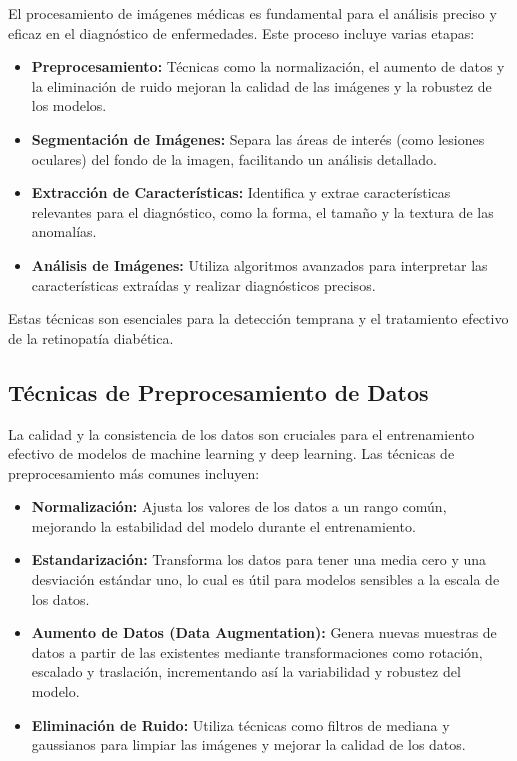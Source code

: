 El procesamiento de imágenes médicas es fundamental para el análisis preciso y eficaz en el diagnóstico de enfermedades. Este proceso incluye varias etapas:

\begin{itemize}
 \item \textbf{Preprocesamiento:} Técnicas como la normalización, el aumento de datos y la eliminación de ruido mejoran la calidad de las imágenes y la robustez de los modelos.
 \item \textbf{Segmentación de Imágenes:} Separa las áreas de interés (como lesiones oculares) del fondo de la imagen, facilitando un análisis detallado.
 \item \textbf{Extracción de Características:} Identifica y extrae características relevantes para el diagnóstico, como la forma, el tamaño y la textura de las anomalías.
 \item \textbf{Análisis de Imágenes:} Utiliza algoritmos avanzados para interpretar las características extraídas y realizar diagnósticos precisos.
\end{itemize}

Estas técnicas son esenciales para la detección temprana y el tratamiento efectivo de la retinopatía diabética.

\subsection{Técnicas de Preprocesamiento de Datos}

La calidad y la consistencia de los datos son cruciales para el entrenamiento efectivo de modelos de machine learning y deep learning. Las técnicas de preprocesamiento más comunes incluyen:

\begin{itemize}
 \item \textbf{Normalización:} Ajusta los valores de los datos a un rango común, mejorando la estabilidad del modelo durante el entrenamiento.
 \item \textbf{Estandarización:} Transforma los datos para tener una media cero y una desviación estándar uno, lo cual es útil para modelos sensibles a la escala de los datos.
 \item \textbf{Aumento de Datos (Data Augmentation):} Genera nuevas muestras de datos a partir de las existentes mediante transformaciones como rotación, escalado y traslación, incrementando así la variabilidad y robustez del modelo.
 \item \textbf{Eliminación de Ruido:} Utiliza técnicas como filtros de mediana y gaussianos para limpiar las imágenes y mejorar la calidad de los datos.
\end{itemize}

